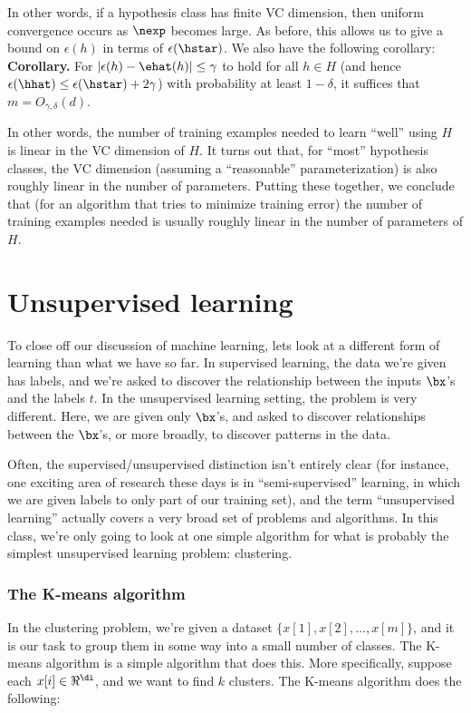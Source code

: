 In other words, if a hypothesis class has finite VC dimension, 
then uniform convergence occurs as $\nexp$ becomes large.  
As before, 
this allows us to give a bound on $\epsilon(h)$ in terms 
of $\epsilon(\hstar)$.  We also
have the following corollary:
\smallskip
\noindent
{\bf Corollary.}  For $|\epsilon(h) - \ehat(h)| \leq \gamma$ to hold for all $h \in H$ 
(and hence $\epsilon(\hhat) \leq \epsilon(\hstar) + 2\gamma$) with probability at least $1-\delta$, 
it suffices that $m = O_{\gamma,\delta}(d)$. 
\smallskip

In other words, the number of training examples needed to learn ``well'' using $H$ is linear 
in the VC dimension of $H$.  It turns out that, for ``most'' hypothesis classes, the VC dimension
(assuming a ``reasonable'' parameterization) is also roughly linear in the number of parameters. 
Putting these together, we conclude that (for an algorithm that 
tries to minimize training error) the number of training 
examples needed is usually roughly linear in the number of parameters of $H$.

\part{Unsupervised learning}

To close off our discussion of machine learning, lets look at a different form of 
learning than what we have so far.  In supervised learning, the data
we're given has labels, and we're asked to discover the relationship between
the inputs $\bx$'s and the labels $t$.  In the unsupervised learning setting, 
the problem is very different.  Here, we are given
only $\bx$'s, and asked to discover relationships between the $\bx$'s, or more
broadly, to discover patterns in the data.

Often, the supervised/unsupervised distinction isn't entirely clear (for instance,
one exciting area of research these days is in ``semi-supervised'' learning, in which
we are given labels to only part of our training set), and the term  ``unsupervised 
learning'' actually covers a very broad set of problems and algorithms.  In this
class, we're only going to look at one simple algorithm for what is probably the 
simplest unsupervised learning problem: clustering.  

\section{The K-means algorithm}

In the clustering problem, we're given a dataset $\{x[1], x[2], \ldots, x[m]\}$, and 
it is our task to group them in some way into a small number of classes.  The K-means
algorithm is a simple algorithm that does this.  More specifically, suppose 
each $x[i] \in \Re^\di$, and we want to find $k$ clusters.  The K-means algorithm
does the following:

